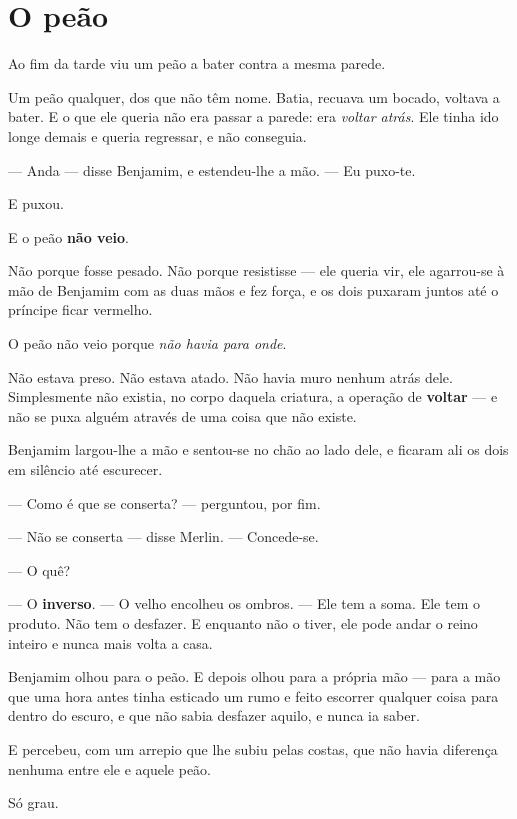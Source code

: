 \documentclass[livro.tex]{subfiles}
\begin{document}
\section*{O peão}

Ao fim da tarde viu um peão a bater contra a mesma parede.

Um peão qualquer, dos que não têm nome. Batia, recuava um bocado, voltava a bater. E o que ele queria não era
passar a parede: era \emph{voltar atrás}. Ele tinha ido longe demais e queria regressar, e não conseguia.

--- Anda --- disse Benjamim, e estendeu-lhe a mão. --- Eu puxo-te.

E puxou.

\medskip

E o peão \textbf{não veio}.

Não porque fosse pesado. Não porque resistisse --- ele queria vir, ele agarrou-se à mão de Benjamim com as duas
mãos e fez força, e os dois puxaram juntos até o príncipe ficar vermelho.

O peão não veio porque \emph{não havia para onde}.

Não estava preso. Não estava atado. Não havia muro nenhum atrás dele. Simplesmente não existia, no corpo daquela
criatura, a operação de \textbf{voltar} --- e não se puxa alguém através de uma coisa que não existe.

\medskip

Benjamim largou-lhe a mão e sentou-se no chão ao lado dele, e ficaram ali os dois em silêncio até escurecer.

--- Como é que se conserta? --- perguntou, por fim.

--- Não se conserta --- disse Merlin. --- Concede-se.

--- O quê?

--- O \textbf{inverso}. --- O velho encolheu os ombros. --- Ele tem a soma. Ele tem o produto. Não tem o desfazer.
E enquanto não o tiver, ele pode andar o reino inteiro e nunca mais volta a casa.

\medskip

Benjamim olhou para o peão. E depois olhou para a própria mão --- para a mão que uma hora antes tinha esticado um
rumo e feito escorrer qualquer coisa para dentro do escuro, e que não sabia desfazer aquilo, e nunca ia saber.

E percebeu, com um arrepio que lhe subiu pelas costas, que não havia diferença nenhuma entre ele e aquele peão.

Só grau.
\end{document}

